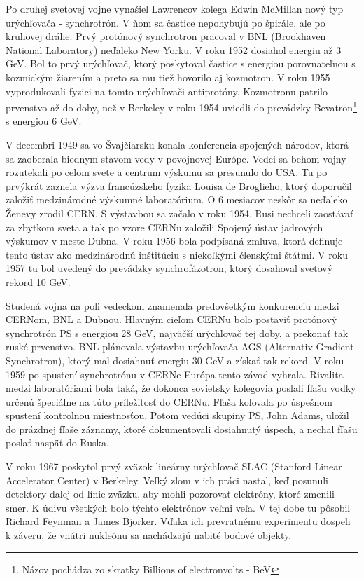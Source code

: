 \documentclass[../../main.tex]{subfiles}
\begin{document}
Po druhej svetovej vojne vynašiel Lawrencov kolega Edwin McMillan nový typ urýchľovača - synchrotrón. V ňom sa častice nepohybujú po špirále, ale po kruhovej dráhe. Prvý protónový synchrotron pracoval v BNL (Brookhaven National Laboratory) neďaleko New Yorku. V roku 1952 dosiahol energiu až 3 GeV. Bol to prvý urýchľovač, ktorý poskytoval častice s energiou porovnateľnou s kozmickým žiarením a preto sa mu tiež hovorilo aj kozmotron. V roku 1955 vyprodukovali fyzici na tomto urýchľovači antiprotóny. Kozmotronu patrilo prvenstvo až do doby, než v Berkeley v roku 1954 uviedli do prevádzky Bevatron\footnote{Názov pochádza zo skratky Billions of electronvolts - BeV} s energiou 6 GeV.

V decembri 1949 sa vo Švajčiarsku konala konferencia spojených národov, ktorá sa zaoberala biednym stavom vedy v povojnovej Európe. Vedci sa behom vojny rozutekali po celom svete a centrum výskumu sa presunulo do USA. Tu po prvýkrát zaznela výzva francúzskeho fyzika Louisa de Broglieho, ktorý doporučil založiť medzinárodné výskumné laboratórium. O 6 mesiacov neskôr sa neďaleko Ženevy zrodil CERN. S výstavbou sa začalo v roku 1954. Rusi nechceli zaostávať za zbytkom sveta a tak po vzore CERNu založili Spojený ústav jadrových výskumov v meste Dubna. V roku 1956 bola podpísaná zmluva, ktorá definuje tento ústav ako medzinárodnú inštitúciu s niekoľkými členskými štátmi. V roku 1957 tu bol uvedený do prevádzky synchrofázotron, ktorý dosahoval svetový rekord 10 GeV.

Studená vojna na poli vedeckom znamenala predovšetkým konkurenciu medzi CERNom, BNL a Dubnou. Hlavným cieľom CERNu bolo postaviť protónový synchrotrón PS s energiou 28 GeV, najväčší urýchľovač tej doby, a prekonať tak ruské prvenstvo. BNL plánovala výstavbu urýchľovača AGS (Alternativ Gradient Synchrotron), ktorý mal dosiahnuť energiu 30 GeV a získať tak rekord. V roku 1959 po spustení synchrotrónu v CERNe Európa tento závod vyhrala. Rivalita medzi laboratóriami bola taká, že dokonca sovietsky kolegovia poslali fľašu vodky určenú špeciálne na túto príležitosť do CERNu. Fľaša kolovala po úspešnom spustení kontrolnou miestnosťou. Potom vedúci skupiny PS, John Adams, uložil do prázdnej fľaše záznamy, ktoré dokumentovali dosiahnutý úspech, a nechal fľašu poslať naspäť do Ruska.

V roku 1967 poskytol prvý zväzok lineárny urýchľovač SLAC (Stanford Linear Accelerator Center) v Berkeley. Veľký zlom v ich práci nastal, keď posunuli detektory ďalej od línie zväzku, aby mohli pozorovať elektróny, ktoré zmenili smer. K údivu všetkých bolo týchto elektrónov veľmi veľa. V tej dobe tu pôsobil Richard Feynman a James Bjorker. Vďaka ich prevratnému experimentu dospeli k záveru, že vnútri nukleónu sa nachádzajú nabité bodové objekty.
\end{document}
